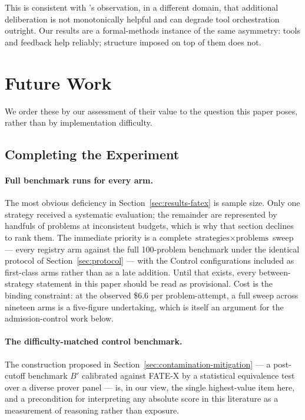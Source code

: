 \documentclass[12pt, a4paper]{article}
\begin{document}
This is consistent with \textcite{zywot2025smallagents}'s observation, in a
different domain, that additional deliberation is not monotonically helpful
and can degrade tool orchestration outright. Our results are a formal-methods
instance of the same asymmetry: tools and feedback help reliably; structure
imposed on top of them does not.

\section{Future Work}
\label{sec:future}

We order these by our assessment of their value to the question this paper
poses, rather than by implementation difficulty.

\subsection{Completing the Experiment}

\paragraph{Full benchmark runs for every arm.} The most obvious deficiency
in Section~\ref{sec:results-fatex} is sample size. Only one strategy
received a systematic evaluation; the remainder are represented by
handfuls of problems at inconsistent budgets, which is why that section
declines to rank them. The immediate priority is a complete
$\text{strategies} \times \text{problems}$ sweep --- every registry arm
against the full 100-problem benchmark under the identical protocol of
Section~\ref{sec:protocol} --- with the Control configurations included as
first-class arms rather than as a late addition. Until that exists, every
between-strategy statement in this paper should be read as provisional.
Cost is the binding constraint: at the observed \$6.6 per problem-attempt,
a full sweep across nineteen arms is a five-figure undertaking, which is
itself an argument for the admission-control work below.

\paragraph{The difficulty-matched control benchmark.} The construction
proposed in Section~\ref{sec:contamination-mitigation} --- a post-cutoff
benchmark $B'$ calibrated against FATE-X by a statistical equivalence test
over a diverse prover panel --- is, in our view, the single highest-value
item here, and a precondition for interpreting any absolute score in this
literature as a measurement of reasoning rather than exposure.
\end{document}
